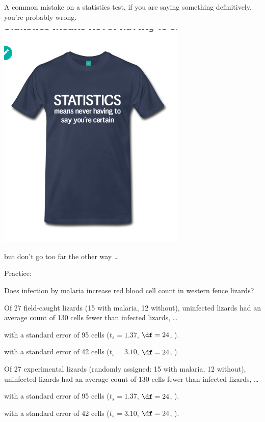 \begin{frame}{A common mistake}
    on a statistics test, if you are saying something definitively,
    you're probably wrong.

    \begin{center}
        \includegraphics[height=0.7\textwidth]{never-certain}
    \end{center}

    \alert{but} don't go too far the other way \ldots
\end{frame}

\begin{frame}{Practice:}

    \alert{Does infection by malaria increase red blood cell count in western fence lizards?}
    \vfill

    Of \alert{27 field-caught lizards} (15 with malaria, 12 without),
    uninfected lizards had an average count of 130 cells fewer than infected lizards,
    \ldots
    
    \vspace{1em}

    with a standard error of 95 cells ($t_s=1.37$, $\df=24$, ).
    \vspace{1em}

    with a standard error of 42 cells ($t_s=3.10$, $\df=24$, ).
    \vfill

    Of \alert{27 experimental lizards} (randomly assigned: 15 with malaria, 12 without),
    uninfected lizards had an average count of 130 cells fewer than infected lizards,
    \ldots
    \vspace{1em}

    with a standard error of 95 cells ($t_s=1.37$, $\df=24$, ).
    \vspace{1em}

    with a standard error of 42 cells ($t_s=3.10$, $\df=24$, ).
    \vfill

\end{frame}

